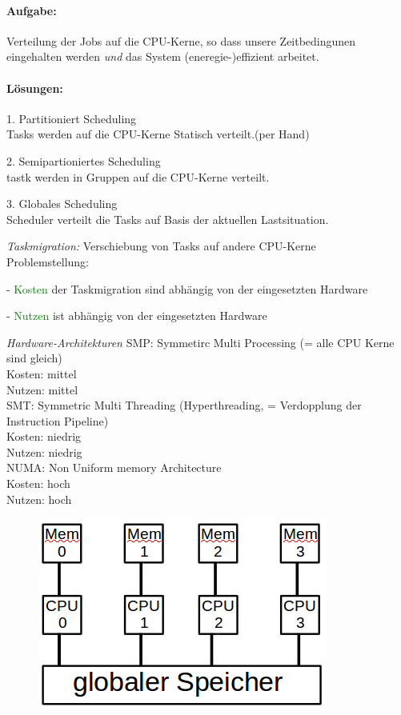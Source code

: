 \documentclass[12pt,a4paper,oneside,ngerman]{article}
\begin{document}
\paragraph{Aufgabe:}
Verteilung der Jobs auf die CPU-Kerne, so dass unsere Zeitbedingunen eingehalten werden \emph{und} das System (eneregie-)effizient arbeitet.

\paragraph{Lösungen:}
\begin{description}
	\item 1. Partitioniert Scheduling\\ Tasks werden auf die CPU-Kerne Statisch verteilt.(per Hand)
	\item 2. Semipartioniertes Scheduling\\ tastk werden in Gruppen auf die CPU-Kerne verteilt.
	\item 3. Globales Scheduling\\ Scheduler verteilt die Tasks auf Basis der aktuellen Lastsituation.
\end{description}

\emph{Taskmigration:} Verschiebung von Tasks auf andere CPU-Kerne\\
Problemstellung:
\begin{description}
	\item - \textcolor{green}{Kosten} der Taskmigration sind abhängig von der eingesetzten Hardware
	\item - \textcolor{green}{Nutzen} ist abhängig von der eingesetzten Hardware
\end{description}

\emph{Hardware-Architekturen}
SMP: Symmetirc Multi Processing (= alle CPU Kerne sind gleich)\\
Kosten: mittel\\
Nutzen: mittel\\
SMT: Symmetric Multi Threading (Hyperthreading, = Verdopplung der Instruction Pipeline)\\
Kosten: niedrig\\
Nutzen: niedrig\\
NUMA: Non Uniform memory Architecture\\
Kosten: hoch\\
Nutzen: hoch\\

\begin{figure}[H]
	\centering
	\includegraphics[scale=0.4]{umlet/numa.png}
\end{figure}
\end{document}
